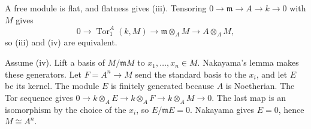 A free module is flat, and flatness gives (iii). Tensoring $0\to\mathfrak{m}\to A\to k\to0$ with $M$ gives
\[0\to\operatorname{Tor}_1^A(k,M)\to\mathfrak{m}\otimes_A M\to A\otimes_A M,\]
so (iii) and (iv) are equivalent.

Assume (iv). Lift a basis of $M/\mathfrak{m}M$ to $x_1,\ldots,x_n\in M$. Nakayama's lemma makes these generators. Let $F=A^n\to M$ send the standard basis to the $x_i$, and let $E$ be its kernel. The module $E$ is finitely generated because $A$ is Noetherian. The Tor sequence gives $0\to k\otimes_A E\to k\otimes_A F\to k\otimes_A M\to0$. The last map is an isomorphism by the choice of the $x_i$, so $E/\mathfrak{m}E=0$. Nakayama gives $E=0$, hence $M\cong A^n$.
